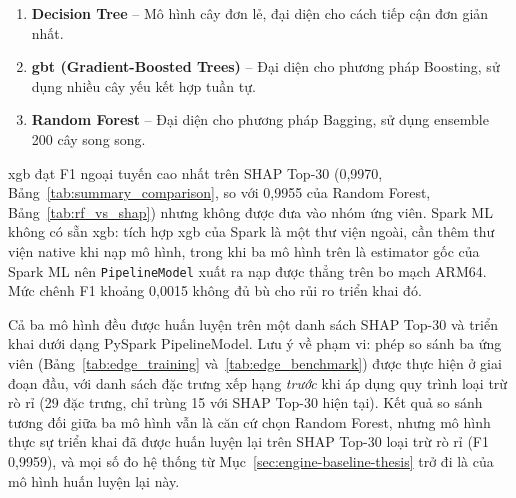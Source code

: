 \begin{enumerate}
    \item \textbf{Decision Tree} -- Mô hình cây đơn lẻ, đại diện cho cách tiếp cận đơn giản nhất.
    \item \textbf{\ac{gbt} (Gradient-Boosted Trees)} -- Đại diện cho phương pháp Boosting, sử dụng nhiều cây yếu kết hợp tuần tự.
    \item \textbf{Random Forest} -- Đại diện cho phương pháp Bagging, sử dụng ensemble 200 cây song song.
\end{enumerate}

\ac{xgb} đạt F1 ngoại tuyến cao nhất trên SHAP Top-30 (0{,}9970, Bảng~\ref{tab:summary_comparison}, so với 0{,}9955 của Random Forest, Bảng~\ref{tab:rf_vs_shap}) nhưng không được đưa vào nhóm ứng viên. Spark ML không có sẵn \ac{xgb}: tích hợp \ac{xgb} của Spark là một thư viện ngoài, cần thêm thư viện native khi nạp mô hình, trong khi ba mô hình trên là estimator gốc của Spark ML nên \texttt{PipelineModel} xuất ra nạp được thẳng trên bo mạch ARM64. Mức chênh F1 khoảng 0{,}0015 không đủ bù cho rủi ro triển khai đó.

Cả ba mô hình đều được huấn luyện trên một danh sách SHAP Top-30 và triển khai dưới dạng PySpark PipelineModel. Lưu ý về phạm vi: phép so sánh ba ứng viên (Bảng~\ref{tab:edge_training} và~\ref{tab:edge_benchmark}) được thực hiện ở giai đoạn đầu, với danh sách đặc trưng xếp hạng \emph{trước} khi áp dụng quy trình loại trừ rò rỉ (29 đặc trưng, chỉ trùng 15 với SHAP Top-30 hiện tại). Kết quả so sánh tương đối giữa ba mô hình vẫn là căn cứ chọn Random Forest, nhưng mô hình thực sự triển khai đã được huấn luyện lại trên SHAP Top-30 loại trừ rò rỉ (F1 0{,}9959), và mọi số đo hệ thống từ Mục~\ref{sec:engine-baseline-thesis} trở đi là của mô hình huấn luyện lại này.

